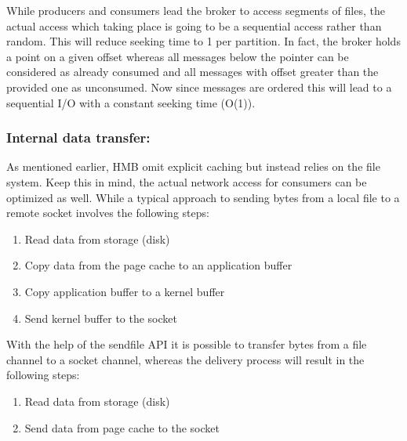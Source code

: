 While producers and consumers lead the broker to access
segments of files, the actual access which taking place is going to be a
sequential access rather than random. This will reduce seeking time to 1 per
partition. In fact, the broker holds a point on a given offset whereas all
messages below the pointer can be considered as already consumed and all
messages with offset greater than the provided one as unconsumed. Now since
messages are ordered this will lead to a sequential I/O with a constant seeking
time (O(1)).


\subsubsection{Internal data transfer:}

As mentioned earlier, HMB omit explicit caching but instead relies on the file system.
Keep this in mind, the actual network access for consumers can be optimized as well.
While a typical approach to sending bytes from a local file to a remote
socket involves the following steps: 
\begin{enumerate}
  \item Read data from storage (disk)
  \item Copy data from the page cache to an application buffer
  \item Copy application buffer to a kernel buffer
  \item Send kernel buffer to the socket
\end{enumerate}

With the help of the sendfile API  it is possible to 
transfer bytes from a file channel to a socket channel, whereas the delivery process will result in the following steps:

\begin{enumerate}
  \item Read data from storage (disk)
  \item Send data from page cache to the socket
\end{enumerate}


